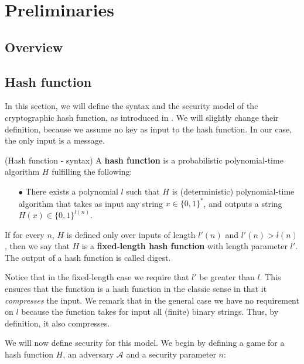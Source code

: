 \chapter*{Preliminaries} \label{Preliminaries}
%
\setcounter{section}{0}
\section{Overview}
%
\section{Hash function}
%
In this section, we will define the syntax and the security model of the cryptographic hash function, as introduced in \cite{Katz:2007:IMC:1206501}. We will slightly change their definition, because we assume no key as input to the hash function. In our case, the only input is a message.
%
\begin{definition}{(Hash function - syntax)} \textnormal{\cite{Katz:2007:IMC:1206501}}
A \textbf{hash function} is a probabilistic polynomial-time algorithm $H$
fulfilling the following:
\begin{itemize}
  \item[$\bullet$] There exists a polynomial $l$ such that $H$ is (deterministic) polynomial-time
  algorithm that takes as input any string $x \in { \{ 0,1 \}}^*$, and outputs
  a string $H(x) \in { \{ 0,1 \}}^{l(n)}$.
\end{itemize}
If for every $n$, $H$ is defined only over inputs of length $l'(n)$ and $l'(n) > l(n)$, then
we say that $H$ is a \textbf{fixed-length hash function} with length parameter $l'$. The output of a hash function is called digest.
\end{definition}

Notice that in the fixed-length case we require that $l'$ be greater than $l$. This ensures that the
function is a hash function in the classic sense in that it \textit{compresses} the input. We remark
that in the general case we have no requirement on $l$ because the function takes for input all (finite) binary strings. Thus, by definition, it also compresses.

We will now define security for this model. We begin by defining a game for a hash function $H$, an adversary $\mathcal{A}$ and a security parameter $n$:
\\

